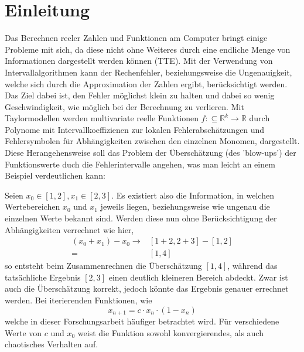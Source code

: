 
\chapter{Einleitung}
\label{ch:Einleitung}
Das Berechnen reeler Zahlen und Funktionen am Computer bringt einige Probleme mit sich, da diese nicht ohne Weiteres durch eine endliche Menge von Informationen dargestellt werden können (TTE). Mit der Verwendung von Intervallalgorithmen kann der Rechenfehler, beziehungsweise die Ungenauigkeit, welche sich durch die Approximation der Zahlen ergibt, berücksichtigt werden. Das Ziel dabei ist, den Fehler möglichst klein zu halten und dabei so wenig Geschwindigkeit, wie möglich bei der Berechnung zu verlieren. Mit Taylormodellen werden multivariate reelle Funktionen $f: \subseteq \mathbb{R}^k \rightarrow \mathbb{R}$ durch Polynome mit Intervallkoeffizienen zur lokalen Fehlerabschätzungen und Fehlersymbolen für Abhängigkeiten zwischen den einzelnen Monomen, dargestellt. Diese Herangehensweise soll das Problem der Überschätzung (des 'blow-ups') der Funktionswerte duch die Fehlerintervalle angehen, was man leicht an einem Beispiel verdeutlichen kann: \par
Seien $x_0 \in [1,2], x_1 \in [2,3] $. Es existiert also die Information, in welchen 
Wertebereichen $x_0$ und $x_1$ jeweils liegen, beziehungsweise wie ungenau die einzelnen Werte bekannt sind. Werden diese nun ohne Berücksichtigung der 
Abhängigkeiten verrechnet wie hier,
\begin{align*}
    (x_0 + x_1) - x_0  \rightarrow & [1 + 2, 2 + 3] - [1, 2]\\
     =& [1,4]
\end{align*}
so entsteht beim Zusammenrechnen die Überschätzung $[1, 4]$, während das tatsächliche Ergebnis $[2,3]$ 
einen deutlich kleineren Bereich abdeckt. Zwar ist auch die Überschätzung korrekt, jedoch könnte das Ergebnis genauer errechnet werden. Bei iterierenden Funktionen, wie 
$$x_{n+1} = c \cdot x_n \cdot (1-x_n)$$
welche in dieser Forschungsarbeit häufiger betrachtet wird. Für verschiedene Werte von $c$ und $x_0$ weist die Funktion sowohl konvergierendes, als auch chaotisches Verhalten auf.

